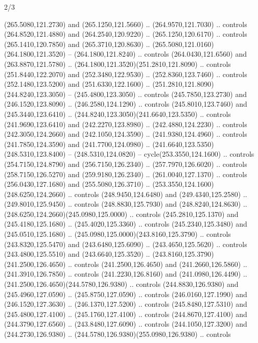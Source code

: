 \begin{flagdescription}{2/3}
\begin{scope}[xshift=0.5\flaglength,yshift=0.5\flagwidth,scale=\flagwidth/259.2]
\begin{scope}[y=0.8pt, x=0.8pt, yscale=-1,shift={(-243,-162)}]
      (265.5080,121.2730) and (265.1250,121.5660) .. (264.9570,121.7030) .. controls
      (264.8520,121.4880) and (264.2540,120.9220) .. (265.1250,120.6170) .. controls
      (265.1410,120.7850) and (265.3710,120.8630) ..
      (265.5080,121.0160)(264.1800,121.3520) -- (264.1800,121.8240) .. controls
      (264.0430,121.6560) and (263.8870,121.5780) ..
      (264.1800,121.3520)(251.2810,121.8090) .. controls (251.8440,122.2070) and
      (252.3480,122.9530) .. (252.8360,123.7460) .. controls (252.1480,123.5200) and
      (251.6330,122.1600) .. (251.2810,121.8090)(244.8240,123.3050) --
      (245.4800,123.3050) .. controls (245.7850,123.2730) and (246.1520,123.8090) ..
      (246.2580,124.1290) .. controls (245.8010,123.7460) and (245.3440,123.6410) ..
      (244.8240,123.3050)(241.6640,123.5350) .. controls (241.9690,123.6410) and
      (242.2270,123.8980) .. (242.4880,124.2230) .. controls (242.3050,124.2660) and
      (242.1050,124.3590) .. (241.9380,124.4960) .. controls (241.7850,124.3590) and
      (241.7700,124.0980) .. (241.6640,123.5350)(248.5310,123.8400) --
      (248.5310,124.0820) -- cycle(253.3550,124.1600) .. controls
      (254.7150,124.8790) and (256.7150,126.2340) .. (257.7970,126.6020) .. controls
      (258.7150,126.5270) and (259.9180,126.2340) .. (261.0040,127.1370) .. controls
      (256.0430,127.1680) and (255.5080,126.3710) ..
      (253.3550,124.1600)(248.6250,124.2660) .. controls (248.9450,124.6480) and
      (249.4340,125.2580) .. (249.8010,125.9450) .. controls (248.8830,125.7930) and
      (248.8240,124.8630) .. (248.6250,124.2660)(245.0980,125.0000) .. controls
      (245.2810,125.1370) and (245.4180,125.1680) .. (245.4020,125.3360) .. controls
      (245.2340,125.3480) and (245.0510,125.1680) ..
      (245.0980,125.0000)(243.8160,125.3790) .. controls (243.8320,125.5470) and
      (243.6480,125.6090) .. (243.4650,125.5620) .. controls (243.4800,125.5510) and
      (243.6640,125.3520) .. (243.8160,125.3790)(241.2500,126.4650) .. controls
      (241.2500,126.4650) and (241.2660,126.5860) .. (241.3910,126.7850) .. controls
      (241.2230,126.8160) and (241.0980,126.4490) ..
      (241.2500,126.4650)(244.5780,126.9380) .. controls (244.8830,126.9380) and
      (245.4960,127.0590) .. (245.8750,127.0590) .. controls (246.0160,127.1990) and
      (246.1520,127.3630) .. (246.1370,127.5200) .. controls (245.8480,127.5310) and
      (245.4800,127.4100) .. (245.1760,127.4100) .. controls (244.8670,127.4100) and
      (244.3790,127.6560) .. (243.8480,127.6090) .. controls (244.1050,127.3200) and
      (244.2730,126.9380) .. (244.5780,126.9380)(255.0980,126.9380) .. controls

\end{scope}
\end{scope}
\end{flagdescription}
